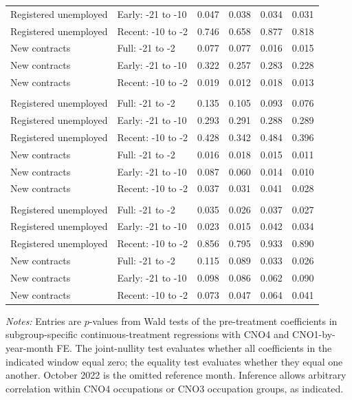 \begin{longtable}{llcccc}
Registered unemployed & Early: -21 to -10 & 0.047 & 0.038 & 0.034 & 0.031 \\
Registered unemployed & Recent: -10 to -2 & 0.746 & 0.658 & 0.877 & 0.818 \\
New contracts & Full: -21 to -2 & 0.077 & 0.077 & 0.016 & 0.015 \\
New contracts & Early: -21 to -10 & 0.322 & 0.257 & 0.283 & 0.228 \\
New contracts & Recent: -10 to -2 & 0.019 & 0.012 & 0.018 & 0.013 \\
\addlinespace
\multicolumn{6}{l}{\textit{Gender: men}} \\
Registered unemployed & Full: -21 to -2 & 0.135 & 0.105 & 0.093 & 0.076 \\
Registered unemployed & Early: -21 to -10 & 0.293 & 0.291 & 0.288 & 0.289 \\
Registered unemployed & Recent: -10 to -2 & 0.428 & 0.342 & 0.484 & 0.396 \\
New contracts & Full: -21 to -2 & 0.016 & 0.018 & 0.015 & 0.011 \\
New contracts & Early: -21 to -10 & 0.087 & 0.060 & 0.014 & 0.010 \\
New contracts & Recent: -10 to -2 & 0.037 & 0.031 & 0.041 & 0.028 \\
\addlinespace
\multicolumn{6}{l}{\textit{Gender: women}} \\
Registered unemployed & Full: -21 to -2 & 0.035 & 0.026 & 0.037 & 0.027 \\
Registered unemployed & Early: -21 to -10 & 0.023 & 0.015 & 0.042 & 0.034 \\
Registered unemployed & Recent: -10 to -2 & 0.856 & 0.795 & 0.933 & 0.890 \\
New contracts & Full: -21 to -2 & 0.115 & 0.089 & 0.033 & 0.026 \\
New contracts & Early: -21 to -10 & 0.098 & 0.086 & 0.062 & 0.090 \\
New contracts & Recent: -10 to -2 & 0.073 & 0.047 & 0.064 & 0.041 \\
\bottomrule
\end{longtable}
\begin{minipage}{0.94\textwidth}\footnotesize\emph{Notes:} Entries are $p$-values from Wald tests of the pre-treatment coefficients in subgroup-specific continuous-treatment regressions with CNO4 and CNO1-by-year-month FE. The joint-nullity test evaluates whether all coefficients in the indicated window equal zero; the equality test evaluates whether they equal one another. October 2022 is the omitted reference month. Inference allows arbitrary correlation within CNO4 occupations or CNO3 occupation groups, as indicated.\end{minipage}
\endgroup
